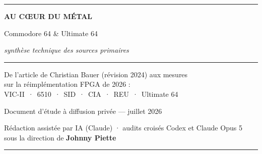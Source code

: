\begin{titlepage}
\thispagestyle{empty}
\centering
\vspace*{2.2cm}
{\color{c64lblue}\rule{\textwidth}{2pt}}\par\vspace{1.1cm}
{\Huge\sffamily\bfseries\color{c64blue} AU CŒUR DU MÉTAL\par}
\vspace{0.7cm}
{\LARGE\sffamily Commodore 64 \& Ultimate 64\par}
\vspace{0.35cm}
{\large\itshape synthèse technique des sources primaires\par}
\vspace{1.1cm}
{\color{c64lblue}\rule{0.55\textwidth}{1pt}}\par
\vspace{1.4cm}
{\large De l'article de Christian Bauer (révision 2024) aux mesures\\
sur la réimplémentation FPGA de 2026 :\\
VIC-II \,·\, 6510 \,·\, SID \,·\, CIA \,·\, REU \,·\, Ultimate 64\par}
\vfill
{\normalsize\sffamily Document d'étude à diffusion privée — juillet 2026\par}
\vspace{0.35cm}
{\small Rédaction assistée par IA (Claude) · audits croisés Codex et Claude Opus 5\\
sous la direction de \textbf{Johnny Piette}\par}
\vspace{0.9cm}
{\color{c64lblue}\rule{\textwidth}{2pt}}\par
\end{titlepage}
